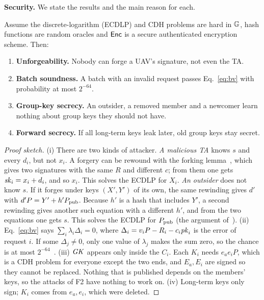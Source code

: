 \documentclass[11pt,openany]{report}
\begin{document}
\textbf{Security.} We state the results and the main reason for each.
\begin{theorem}[Security of C1]\label{thm:c1}
Assume the discrete-logarithm (ECDLP) and CDH problems are hard in $\mathbb{G}$, hash functions are random oracles and $\mathsf{Enc}$ is a secure authenticated
encryption scheme. Then:
\begin{enumerate}[leftmargin=*,label=(\roman*)]
\item \textbf{Unforgeability.} Nobody can forge a UAV's signature, not even the TA.
\item \textbf{Batch soundness.} A batch with an invalid request passes Eq.~\eqref{eq:bv} with probability at most $2^{-64}$.
\item \textbf{Group-key secrecy.} An outsider, a removed member and a newcomer learn nothing about group keys they should not have.
\item \textbf{Forward secrecy.} If all long-term keys leak later, old group keys stay secret.
\end{enumerate}
\end{theorem}
\begin{proof}[Proof sketch]
(i) There are two kinds of attacker. \emph{A malicious TA} knows $s$ and every $d_i$, but not $x_i$. A forgery can be rewound with the forking
lemma~\cite{forking}, which gives two signatures with the same $R$ and different $c$; from them one gets $\mathit{sk}_i=x_i+d_i$, and so $x_i$. This solves the
ECDLP for $X_i$. \emph{An outsider} does not know $s$. If it forges under keys $(X',Y')$ of its own, the same rewinding gives $d'$ with
$d'P=Y'+h'P_{\mathrm{pub}}$. Because $h'$ is a hash that includes $Y'$, a second rewinding gives another such equation with a different $h'$, and from the two
equations one gets $s$. This solves the ECDLP for $P_{\mathrm{pub}}$ (the argument of~\cite{gg09}). (ii) Eq.~\eqref{eq:bv} says $\sum_i\lambda_i\Delta_i=0$, where $\Delta_i=v_iP-R_i-c_i\mathit{pk}_i$ is the error of request $i$. If
some $\Delta_j\ne0$, only one value of $\lambda_j$ makes the sum zero, so the chance is at most $2^{-64}$~\cite{bgr}. (iii) $\mathit{GK}$ appears only inside
the $C_i$. Each $K_i$ needs $e_ae_iP$, which is a CDH problem for everyone except the two ends, and $E_a,E_i$ are signed so they cannot be replaced.
Nothing that is published depends on the members' keys, so the attacks of F2 have nothing to work on. (iv) Long-term keys only sign; $K_i$ comes
from $e_a,e_i$, which were deleted.
\end{proof}
\end{document}

